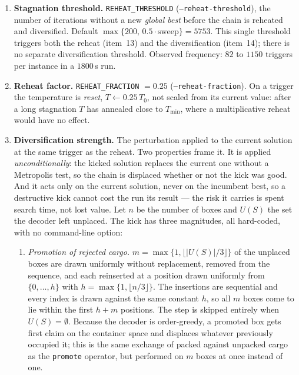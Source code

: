 \begin{enumerate}
  \item \textbf{Stagnation threshold.}
        \texttt{REHEAT\_THRESHOLD} (\texttt{--reheat-threshold}), the number of
        iterations without a new \emph{global best} before the chain is
        reheated and diversified. Default
        $\max\{200,\,0.5\cdot \text{sweep}\} = 5753$.
        This single threshold triggers both the reheat (item~13) and the
        diversification (item~14); there is no separate diversification
        threshold. Observed frequency: $82$ to $1150$ triggers per instance in
        a $1800$\,s run.

  \item \textbf{Reheat factor.}
        \texttt{REHEAT\_FRACTION} $= 0.25$ (\texttt{--reheat-fraction}). On a
        trigger the temperature is \emph{reset},
        $T \leftarrow 0.25\,T_0$, not scaled from its current value: after a
        long stagnation $T$ has annealed close to $T_{\min}$, where a
        multiplicative reheat would have no effect.

  \item \textbf{Diversification strength.}
        The perturbation applied to the current solution at the same trigger
        as the reheat. Two properties frame it. It is applied
        \emph{unconditionally}: the kicked solution replaces the current one
        without a Metropolis test, so the chain is displaced whether or not
        the kick was good. And it acts only on the current solution, never on
        the incumbent best, so a destructive kick cannot cost the run its
        result --- the risk it carries is spent search time, not lost value.
        Let $n$ be the number of boxes and $U(S)$ the set the decoder left
        unplaced. The kick has three magnitudes, all hard-coded, with no
        command-line option:
        \begin{enumerate}

          \item \emph{Promotion of rejected cargo.}
                $m = \max\{1, \lfloor |U(S)|/3 \rfloor\}$ of the unplaced
                boxes are drawn uniformly without replacement, removed from
                the sequence, and each reinserted at a position drawn
                uniformly from $\{0,\dots,h\}$ with
                $h = \max\{1, \lfloor n/3 \rfloor\}$. The insertions are
                sequential and every index is drawn against the same constant
                $h$, so all $m$ boxes come to lie within the first $h+m$
                positions. The step is skipped entirely when
                $U(S) = \emptyset$. Because the decoder is order-greedy, a
                promoted box gets first claim on the container space and
                displaces whatever previously occupied it; this is the
                same exchange of packed against unpacked cargo as the
                \texttt{promote} operator, but performed on $m$ boxes at once
                instead of one.


\end{enumerate}
\end{enumerate}
